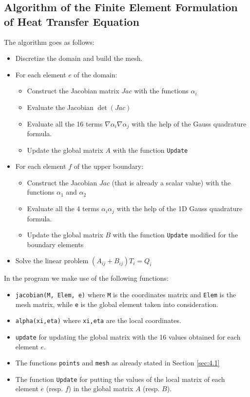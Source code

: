 \subsection{Algorithm of the Finite Element Formulation of Heat Transfer Equation}
\begin{mdframed}
	The algorithm goes as follows:
	\begin{itemize}
		\item Discretize the domain and build the mesh.
		\item For each element $ e $ of the domain:
		\begin{itemize}
			\item Construct the Jacobian matrix $ Jac $ with the functions $ \alpha_i $
			\item Evaluate the Jacobian $ \det(Jac) $
			\item Evaluate all the 16 terms $ \nabla\alpha_i\nabla\alpha_j $ with the help of the Gauss quadrature formula.
			\item Update the global matrix $ A $ with the function \texttt{Update}
		\end{itemize}
		\item For each element $ f $ of the upper boundary:
		\begin{itemize}
			\item Construct the Jacobian $ Jac $ (that is already a scalar value) with the functions $ \alpha_1 $ and $ \alpha_2 $
			\item Evaluate all the 4 terms $ \alpha_i\alpha_j $ with the help of the 1D Gauss quadrature formula.
			\item Update the global matrix $ B $ with the function \texttt{Update} modified for the boundary elements
		\end{itemize}
		\item Solve the linear problem $ (A_{ij}+B_{ij})T_i = Q_i $
	\end{itemize}
\end{mdframed}


In the program we make use of the following functions:
\begin{itemize}
	\item \texttt{jacobian(M, Elem, e)} where \texttt{M} is the coordinates matrix and \texttt{Elem} is the mesh matrix, while \texttt{e} is the global element taken into consideration.
	\item \texttt{alpha(xi,eta)} where \texttt{xi,eta} are the local coordinates.
	\item \texttt{update} for updating the global matrix with the 16 values obtained for each element $ e $. 
	\item The functions \texttt{points} and \texttt{mesh} as already stated in Section \ref{sec:4.1} 
	\item The function \texttt{Update} for putting the values of the local matrix of each element $ e $ (resp. $ f $) in the global matrix $ A $ (resp. $ B $).
\end{itemize}


